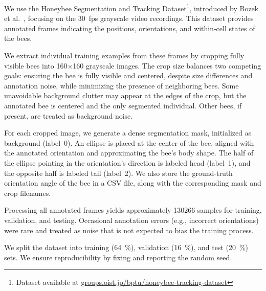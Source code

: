 We use the Honeybee Segmentation and Tracking Dataset\footnote{Dataset available at \href{https://groups.oist.jp/bptu/honeybee-tracking-dataset}{groups.oist.jp/bptu/honeybee-tracking-dataset}}, introduced by Bozek et al.~\cite{bozek2021markerless}, focusing on the \qty{30}{fps} grayscale video recordings.
This dataset provides annotated frames indicating the positions, orientations, and within-cell states of the bees.

We extract individual training examples from these frames by cropping fully visible bees into 160$\times$160 grayscale images.
The crop size balances two competing goals: ensuring the bee is fully visible and centered, despite size differences and annotation noise, while minimizing the presence of neighboring bees.
Some unavoidable background clutter may appear at the edges of the crop, but the annotated bee is centered and the only segmented individual.
Other bees, if present, are treated as background noise.

For each cropped image, we generate a dense segmentation mask, initialized as background (label~0).
An ellipse is placed at the center of the bee, aligned with the annotated orientation and approximating the bee’s body shape.
The half of the ellipse pointing in the orientation's direction is labeled head (label~1), and the opposite half is labeled tail (label~2).
We also store the ground-truth orientation angle of the bee in a CSV file, along with the corresponding mask and crop filenames.

Processing all annotated frames yields approximately \qty{130266}{} samples for training, validation, and testing.
Occasional annotation errors (e.g., incorrect orientations) were rare and treated as noise that is not expected to bias the training process.

We split the dataset into training (\qty{64}{\percent}), validation (\qty{16}{\percent}), and test (\qty{20}{\percent}) sets.
We ensure reproducibility by fixing and reporting the random seed.